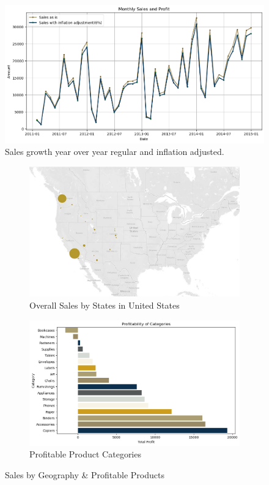 \documentclass[11pt]{article} %
\begin{document}
\begin{figure}[H]
    \centering
    \includegraphics[scale=0.4]{images/sales_inflation_adjustment.png}
    \caption{Sales growth year over year regular and inflation adjusted.}
    \label{fig:Sales growth}
\end{figure}

\begin{figure}[H]
  \centering
  \begin{subfigure}[b]{0.4\textwidth}
    \includegraphics[width=\textwidth]{images/EDA_Geography.jpg}
    \caption{Overall Sales by States in United States}
    \label{fig:sub1}
  \end{subfigure}
  \hfill
  \begin{subfigure}[b]{0.4\textwidth}
    \includegraphics[width=\textwidth]{images/EDA_profitable_category.png}
    \caption{Profitable Product Categories}
    \label{fig:sub2}
  \end{subfigure}
  \caption{Sales by Geography \& Profitable Products}
  \label{fig:twosidebyside}
\end{figure}
\end{document}
